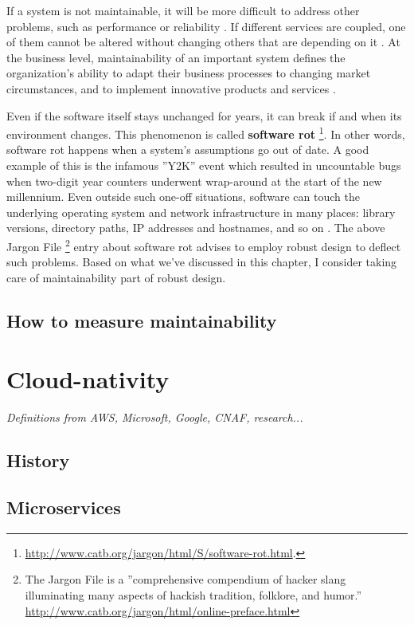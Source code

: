 \documentclass[utf8,english]{gradu3}
\newcommand{\tmp}[1]{\textit{{#1}}}
\begin{document}
If a system is not maintainable, it will be more difficult to address other
problems, such as performance or reliability \parencite[46]{Bouwers2010}. If different
services are coupled, one of them cannot be altered without changing others that
are depending on it \parencite[2]{Vale2022}. At the business level, maintainability of an
important system defines the organization's ability to adapt their business
processes to changing market circumstances, and to implement innovative products
and services \parencite[21]{Broy2006}.

Even if the software itself stays unchanged for years, it can break if and when
its environment changes. This phenomenon is called \textbf{software rot}
\footnote{\url{http://www.catb.org/jargon/html/S/software-rot.html}.}.
In other words, software rot happens when a system's assumptions
go out of date. A good example of this is the infamous ''Y2K'' event which
resulted in uncountable bugs when two-digit year counters underwent wrap-around
at the start of the new millennium. Even outside such one-off
situations, software can touch the underlying operating system and network
infrastructure in many places: library versions, directory paths, IP addresses
and hostnames, and so on \parencite{Heroku2011}. The above Jargon File \footnote{The Jargon
File is a ''comprehensive compendium of hacker slang illuminating many aspects
of hackish tradition, folklore, and humor.''
\url{http://www.catb.org/jargon/html/online-preface.html}} entry about software
rot advises to employ robust design to deflect such problems. Based on what
we've discussed in this chapter, I consider taking care of maintainability part
of robust design.


\subsection{How to measure maintainability}


\section{Cloud-nativity}

\tmp{Definitions from AWS, Microsoft, Google, CNAF, research...}
\subsection{History}

\subsection{Microservices}
\end{document}
